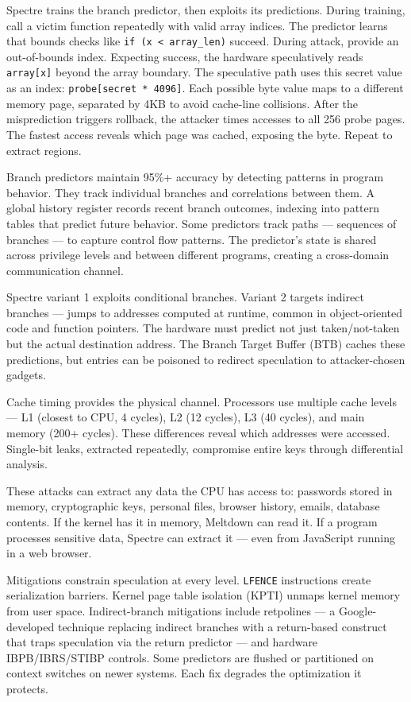Spectre trains the branch predictor, then exploits its predictions. During training, call a victim function repeatedly with valid array indices. The predictor learns that bounds checks like \texttt{if (x < array\_len)} succeed. During attack, provide an out-of-bounds index. Expecting success, the hardware speculatively reads \texttt{array[x]} beyond the array boundary. The speculative path uses this secret value as an index: \texttt{probe[secret * 4096]}. Each possible byte value maps to a different memory page, separated by 4KB to avoid cache-line collisions. After the misprediction triggers rollback, the attacker times accesses to all 256 probe pages. The fastest access reveals which page was cached, exposing the byte. Repeat to extract regions.

Branch predictors maintain 95\%+ accuracy by detecting patterns in program behavior. They track individual branches and correlations between them. A global history register records recent branch outcomes, indexing into pattern tables that predict future behavior. Some predictors track paths — sequences of branches — to capture control flow patterns. The predictor's state is shared across privilege levels and between different programs, creating a cross-domain communication channel.

Spectre variant 1 exploits conditional branches. Variant 2 targets indirect branches — jumps to addresses computed at runtime, common in object-oriented code and function pointers. The hardware must predict not just taken/not-taken but the actual destination address. The Branch Target Buffer (BTB) caches these predictions, but entries can be poisoned to redirect speculation to attacker-chosen gadgets.

Cache timing provides the physical channel. Processors use multiple cache levels — L1 (closest to CPU, 4 cycles), L2 (12 cycles), L3 (40 cycles), and main memory (200+ cycles). These differences reveal which addresses were accessed. Single-bit leaks, extracted repeatedly, compromise entire keys through differential analysis.

These attacks can extract any data the CPU has access to: passwords stored in memory, cryptographic keys, personal files, browser history, emails, database contents. If the kernel has it in memory, Meltdown can read it. If a program processes sensitive data, Spectre can extract it — even from JavaScript running in a web browser. 

Mitigations constrain speculation at every level. \texttt{LFENCE} instructions create serialization barriers. Kernel page table isolation (KPTI) unmaps kernel memory from user space. Indirect-branch mitigations include retpolines — a Google-developed technique replacing indirect branches with a return-based construct that traps speculation via the return predictor — and hardware IBPB/IBRS/STIBP controls. Some predictors are flushed or partitioned on context switches on newer systems. Each fix degrades the optimization it protects.

